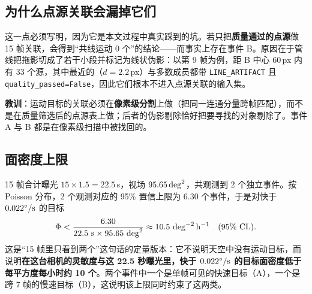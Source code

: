 \documentclass[11pt,a4paper]{ctexart}
\begin{document}
\subsection{为什么点源关联会漏掉它们}\label{sec:lessons}
这一点必须写明，因为它是本文过程中真实踩到的坑。若只把\textbf{质量通过的点源}做 15 帧关联，会得到“共线运动 0 个”的结论——而事实上存在事件 B。原因在于管线把拖影切成了若干小段并标记为线状伪影：以第 9 帧为例，距 B 中心 60\,px 内有 33 个源，其中最近的（$d=2.2$\,px）与多数成员都带 \texttt{LINE\_ARTIFACT} 且 \texttt{quality\_passed=False}，因此它们根本不进入点源关联的输入集。

\textbf{教训}：运动目标的关联必须在\textbf{像素级分割}上做（把同一连通分量跨帧匹配），而不是在质量筛选后的点源表上做；后者的伪影剔除恰好把要寻找的对象剔除了。事件 A 与 B 都是在像素级扫描中被找回的。

\subsection{面密度上限}
15 帧合计曝光 $15\times1.5=22.5$\,s，视场 $95.65\,{\rm deg}^2$，共观测到 2 个独立事件。按 Poisson 分布，2 个观测对应的 95\% 置信上限为 6.30 个事件，于是对快于 $0.022^\circ/{\rm s}$ 的目标
\begin{equation}
\Phi<\frac{6.30}{22.5\ {\rm s}\times95.65\ {\rm deg}^2}\approx10.5\ {\rm deg}^{-2}\,{\rm h}^{-1}\quad(95\%\ {\rm CL}).
\label{eq:rate}
\end{equation}
这是“15 帧里只看到两个”这句话的定量版本：它不说明天空中没有运动目标，而说明\textbf{在这台相机的灵敏度与这 22.5 秒曝光里，快于 $0.022^\circ/{\rm s}$ 的目标面密度低于每平方度每小时约 10 个}。两个事件中一个是单帧可见的快速目标（A），一个是跨 7 帧的慢速目标（B），这说明该上限同时约束了这两类。
\end{document}
